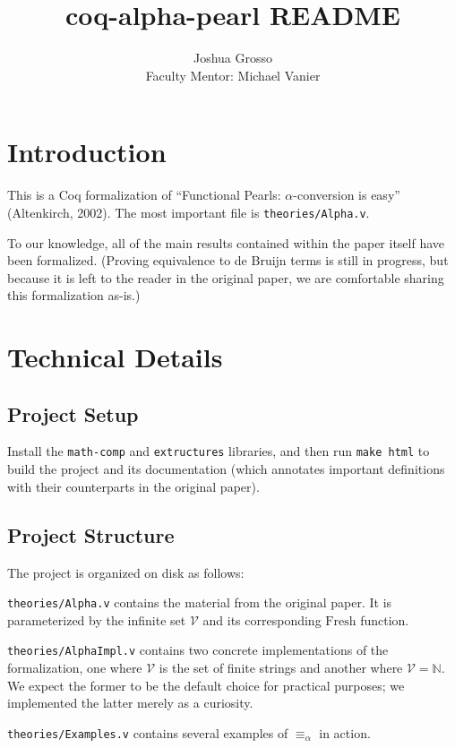 \documentclass{article}
\title{coq-alpha-pearl README}
\author{Joshua Grosso \\ Faculty Mentor: Michael Vanier}
\begin{document}
\maketitle

\section{Introduction}

This is a Coq formalization of ``Functional Pearls: $\alpha$-conversion is easy'' (Altenkirch, 2002). The most important file is \verb|theories/Alpha.v|.

To our knowledge, all of the main results contained within the paper itself have been formalized. (Proving equivalence to de Bruijn terms is still in progress, but because it is left to the reader in the original paper, we are comfortable sharing this formalization as-is.)

\section{Technical Details}

\subsection{Project Setup}

Install the \verb|math-comp| and \verb|extructures| libraries, and then run \verb|make html| to
build the project and its documentation (which annotates important definitions with their
counterparts in the original paper).

\subsection{Project Structure}

The project is organized on disk as follows:

\verb|theories/Alpha.v| contains the material from the original paper. It is parameterized by the infinite set $\mathcal{V}$ and its corresponding $\textrm{Fresh}$ function.

\verb|theories/AlphaImpl.v| contains two concrete implementations of the formalization, one where
$\mathcal{V}$ is the set of finite strings and another where $\mathcal{V} = \mathbb{N}$. We expect
the former to be the default choice for practical purposes; we implemented the latter merely as a
curiosity.

\verb|theories/Examples.v| contains several examples of $\equiv_\alpha$ in action.
\end{document}
